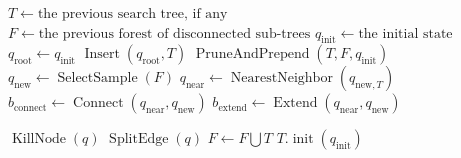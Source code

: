 \begin{algorithm}[ht!]
\caption{$\operatorname{MPRRTSearch}(q_{\text{init}})$}
\label{alg:mprrtsearch}
\begin{algorithmic}[1]
    \STATE \(T \leftarrow \text{the previous search tree, if any}\)
    \STATE \(F \leftarrow \text{the previous forest of disconnected sub-trees}\)
    \STATE \(q_{\text{init}} \leftarrow \text{the initial state}\)
        \STATE \(q_{\text{root}} \leftarrow  q_{\text{init}}\)
        \STATE \(\operatorname{Insert}(q_{\text{root}},T)\)
    \ELSE
        \STATE \(\operatorname{PruneAndPrepend}(T,F,q_{\text{init}})\)
            \RETURN \TRUE
        \ENDIF
    \ENDIF
        \STATE \(q_{\text{new}} \leftarrow  \operatorname{SelectSample}(F)\)
        \STATE \(q_{\text{near}} \leftarrow  \operatorname{NearestNeighbor}(q_{\text{new},T})\)
            \STATE \(b_{\text{connect}} \leftarrow  \operatorname{Connect}(q_{\text{near}},q_{\text{new}})\)
                \RETURN \TRUE
            \ENDIF
        \ELSE
            \STATE \(b_{\text{extend}} \leftarrow   \operatorname{Extend}(q_{\text{near}},q_{\text{new}})\)
                \RETURN \TRUE
            \ENDIF
        \ENDIF
    \ENDWHILE
    \RETURN \FALSE
\end{algorithmic}
\end{algorithm}

\begin{algorithm}[ht!]
\caption{$\operatorname{PruneAndPrepend}(T,F,q_{\text{init}})$}
\label{alg:pruneandprepend}
\begin{algorithmic}[1]
            \STATE \(\operatorname{KillNode}(q)\)
            \STATE \(\operatorname{SplitEdge}(q)\)
        \ENDIF
    \ENDFOR
            \STATE \(F \leftarrow  F \bigcup T\)
            \STATE \(T.\operatorname{init}(q_{\text{init}})\)
        \ENDIF
    \ENDIF
\end{algorithmic}
\end{algorithm}


